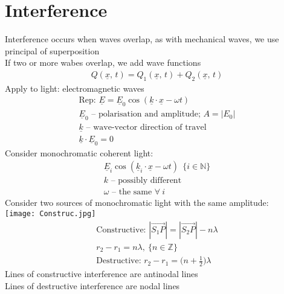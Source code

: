\documentclass[a4paper, 11pt, fleqn, normalem]{report}
\begin{document}
\section{Interference}
Interference occurs when waves overlap, as with mechanical waves, we use principal of superposition \\
If two or more wabes overlap, we add wave functions
\begin{gather*}
    Q(\underline{x},\,t) = Q_{1}(\underline{x},\,t) + Q_{2}(\underline{x},\,t)
\end{gather*}
Apply to light: electromagnetic waves
\begin{gather*}
    \text{Rep: }\underline{E} = \underline{E}_{0}\cos{(\underline{k}\cdot\underline{x} - \omega t)} \\
    \underline{E}_{0}\text{ -- polarisation and amplitude; }A = |E_{0}| \\
    \underline{k}\text{ -- wave-vector direction of travel} \\
    \underline{k}\cdot\underline{E}_{0} = 0
\end{gather*}
Consider monochromatic coherent light:
\begin{gather*}
    \underline{E}_{i}\cos{(\underline{k}_{i}\cdot\underline{x} - \omega t)}~~\{i \in \mathbb{N}\} \\
    k\text{ -- possibly different} \\
    \omega\text{ -- the same }\forall ~i
\end{gather*}
Consider two sources of monochromatic light with the same amplitude: \\
\texttt{[image: Construc.jpg]}
\begin{gather*}
    \text{Constructive: }|\overrightarrow{S_{1}P}| = |\overrightarrow{S_{2}P}| - n\lambda \\
    r_{2} - r_{1} = n\lambda, ~\{n \in \mathbb{Z}\} \\
    \text{Destructive: }r_{2} - r_{1} = \Big(n + \frac{1}{2}\Big)\lambda
\end{gather*}
Lines of constructive interference are antinodal lines \\
Lines of destructive interference are nodal lines
\end{document}
